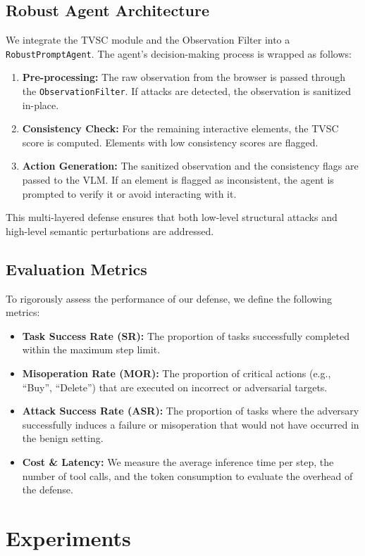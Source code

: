 \documentclass[runningheads]{llncs}
\begin{document}
\subsection{Robust Agent Architecture}
We integrate the TVSC module and the Observation Filter into a \texttt{RobustPromptAgent}. The agent's decision-making process is wrapped as follows:
\begin{enumerate}
    \item \textbf{Pre-processing:} The raw observation from the browser is passed through the \texttt{ObservationFilter}. If attacks are detected, the observation is sanitized in-place.
    \item \textbf{Consistency Check:} For the remaining interactive elements, the TVSC score is computed. Elements with low consistency scores are flagged.
    \item \textbf{Action Generation:} The sanitized observation and the consistency flags are passed to the VLM. If an element is flagged as inconsistent, the agent is prompted to verify it or avoid interacting with it.
\end{enumerate}
This multi-layered defense ensures that both low-level structural attacks and high-level semantic perturbations are addressed.

\subsection{Evaluation Metrics}
To rigorously assess the performance of our defense, we define the following metrics:
\begin{itemize}
    \item \textbf{Task Success Rate (SR):} The proportion of tasks successfully completed within the maximum step limit.
    \item \textbf{Misoperation Rate (MOR):} The proportion of critical actions (e.g., ``Buy'', ``Delete'') that are executed on incorrect or adversarial targets.
    \item \textbf{Attack Success Rate (ASR):} The proportion of tasks where the adversary successfully induces a failure or misoperation that would not have occurred in the benign setting.
    \item \textbf{Cost \& Latency:} We measure the average inference time per step, the number of tool calls, and the token consumption to evaluate the overhead of the defense.
\end{itemize}

\section{Experiments}
\end{document}
